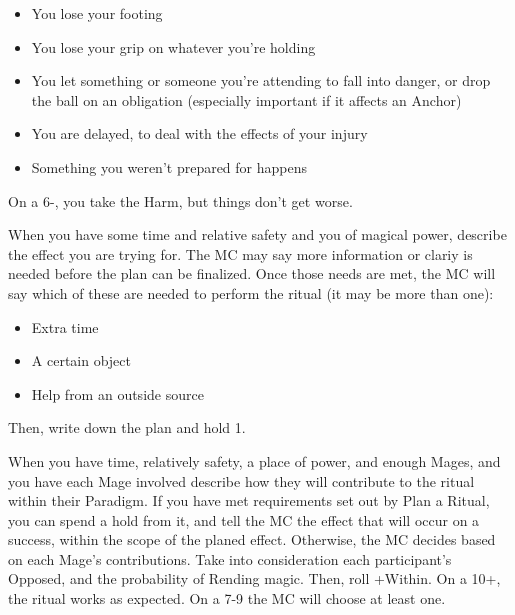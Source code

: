 \begin{multicols}{3}
\begin{move}
    \begin{itemize}
      \setlength\itemsep{0em}
    \item You lose your footing
    \item You lose your grip on whatever you’re holding
    \item  You let something or someone you’re attending to fall into danger, or drop the ball on an obligation (especially important if it affects an Anchor)
    \item You are delayed, to deal with the effects of your injury
    \item Something you weren’t prepared for happens 
    \end{itemize}
On a 6-, you take the Harm, but things don’t get worse.

  \end{move}

  \columnbreak
  
  \begin{move}
    When you have some time and relative safety and you  of magical power, describe the effect you are trying for. The MC may say more information or clariy is needed before the plan can be finalized. Once those needs are met, the MC will say which of these are needed to perform the ritual (it may be more than one):

    \begin{itemize}
      \setlength\itemsep{0em}
    \item Extra time
    \item A certain object
    \item Help from an outside source 
    \end{itemize}
Then, write down the plan and hold 1.

  \end{move}

  \SEPARATOR

  \begin{move}
    When you have time, relatively safety, a place of power, and enough Mages, and you  have each Mage involved describe how they will contribute to the ritual within their Paradigm. If you have met requirements set out by Plan a Ritual, you can spend a hold from it, and tell the MC the effect that will occur on a success, within the scope of the planed effect. Otherwise, the MC decides based on each Mage’s contributions. Take into consideration each participant’s Opposed, and the probability of Rending magic. Then, roll +Within. On a 10+, the ritual works as expected. On a 7-9 the MC will choose at least one.


\end{move}
\end{multicols}
